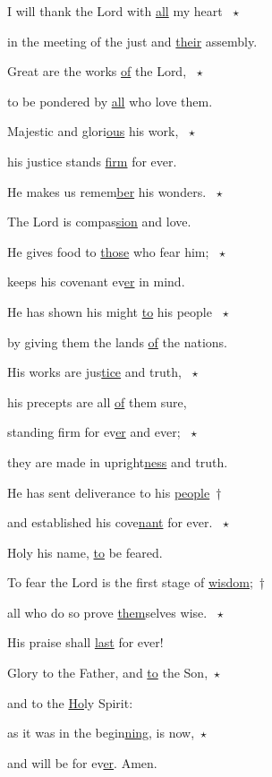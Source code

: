 \noindent I will thank the Lord with \uline{all} my heart ~$\star$~\nopagebreak

in the meeting of the just and \uline{their} assembly.

\noindent Great are the works \uline{of} the Lord, ~$\star$~\nopagebreak

to be pondered by \uline{all} who love them.



\noindent Majestic and glori\uline{ous} his work, ~$\star$~\nopagebreak

his justice stands \uline{firm} for ever.

\noindent He makes us remem\uline{ber} his wonders. ~$\star$~\nopagebreak

The Lord is compas\uline{sion} and love.



\noindent He gives food to \uline{those} who fear him; ~$\star$~\nopagebreak

keeps his covenant ev\uline{er} in mind.

\noindent He has shown his might \uline{to} his people ~$\star$~\nopagebreak

by giving them the lands \uline{of} the nations.



\noindent His works are jus\uline{tice} and truth, ~$\star$~\nopagebreak

his precepts are all \uline{of} them sure,

\noindent standing firm for ev\uline{er} and ever; ~$\star$~\nopagebreak

they are made in upright\uline{ness} and truth.



\noindent He has sent deliverance to his \uline{people}~†~\nopagebreak

and established his cove\uline{nant} for ever. ~$\star$~\nopagebreak

Holy his name, \uline{to} be feared.



\noindent To fear the Lord is the first stage of \uline{wisdom;}~†~\nopagebreak

all who do so prove \uline{them}selves wise. ~$\star$~\nopagebreak

His praise shall \uline{last} for ever!



\noindent Glory to the Father, and \uline{to} the Son,~$\star$~\nopagebreak

and to the \uline{Ho}ly Spirit:

\noindent as it was in the begin\uline{ning}, is now,~$\star$~\nopagebreak

and will be for ev\uline{er}. Amen.
